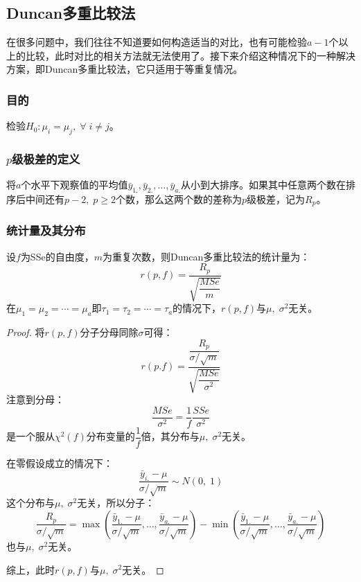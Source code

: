 \subsection{Duncan多重比较法}
在很多问题中，我们往往不知道要如何构造适当的对比，也有可能检验$a-1$个以上的比较，此时对比的相关方法就无法使用了。接下来介绍这种情况下的一种解决方案，即Duncan多重比较法，它只适用于等重复情况。
\subsubsection{目的}
检验$H_0:\mu_i=\mu_j,\;\forall\;i\ne j$。
\subsubsection{$p$级极差的定义}
\begin{definition}
	将$a$个水平下观察值的平均值$\bar{y}_{1.},\bar{y}_{2.},\dots,\bar{y}_{a.}$从小到大排序。如果其中任意两个数在排序后中间还有$p-2,\;p\geqslant2$个数，那么这两个数的差称为$p$级极差，记为$R_p$。
\end{definition}
\subsubsection{统计量及其分布}
设$f$为SSe的自由度，$m$为重复次数，则Duncan多重比较法的统计量为：
\begin{equation*}
	r(p,f)=\frac{R_p}{\sqrt{\dfrac{MSe}{m}}}
\end{equation*}
在$\mu_1=\mu_2=\cdots=\mu_a$即$\tau_1=\tau_2=\cdots=\tau_a$的情况下，$r(p,f)$与$\mu,\;\sigma^2$无关。
\begin{proof}
	将$r(p,f)$分子分母同除$\sigma$可得：
	\begin{equation*}
		r(p.f)=\frac{\dfrac{R_p}{\sigma/\sqrt{m}}}{\sqrt{\dfrac{MSe}{\sigma^2}}}
	\end{equation*}
	注意到分母：
	\begin{equation*}
		\frac{MSe}{\sigma^2}=\frac{1}{f}\frac{SSe}{\sigma^2}
	\end{equation*}
	是一个服从$\chi^2(f)$分布变量的$\dfrac{1}{f}$倍，其分布与$\mu,\;\sigma^2$无关。\par
	在零假设成立的情况下：
	\begin{equation*}
		\frac{\bar{y}_{i.}-\mu}{\sigma/\sqrt{m}}\sim N(0,\;1)
	\end{equation*}
	这个分布与$\mu,\;\sigma^2$无关，所以分子：
	\begin{equation*}
		\frac{R_p}{\sigma/\sqrt{m}}=\max(\frac{\bar{y}_{1.}-\mu}{\sigma/\sqrt{m}},\dots,\frac{\bar{y}_{a.}-\mu}{\sigma/\sqrt{m}})-\min(\frac{\bar{y}_{1.}-\mu}{\sigma/\sqrt{m}},\dots,\frac{\bar{y}_{a.}-\mu}{\sigma/\sqrt{m}})
	\end{equation*}
	也与$\mu,\;\sigma^2$无关。\par
	综上，此时$r(p,f)$与$\mu,\;\sigma^2$无关。
\end{proof}
